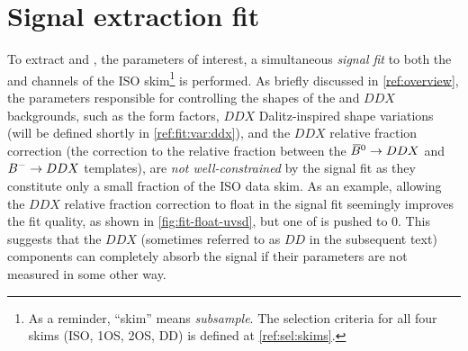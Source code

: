 \chapter{Signal extraction fit}
\label{ref:fit}

To extract \RD and \RDst, the parameters of interest,
a simultaneous \emph{signal fit}
to both the \Dz and \Dstar channels of the ISO skim\footnote{
    As a reminder, ``skim'' means \emph{subsample}.
    The selection criteria for all four skims (ISO, 1OS, 2OS, DD) is defined at
    \cref{ref:sel:skims}.
} is performed.
As briefly discussed in \cref{ref:overview},
the parameters responsible for controlling the shapes of the \Dstst and
$DDX$ backgrounds,
such as the \Dstst form factors,
$DDX$ Dalitz-inspired shape variations
(will be defined shortly in \cref{ref:fit:var:ddx}),
and the $DDX$ relative fraction correction
(the correction to the relative fraction between the
${{\kern 0.18em\overline{\kern -0.18em B}}{}^0} \rightarrow DDX$ and ${{{B}^-}} \rightarrow DDX$ templates),
are \emph{not well-constrained} by the signal fit as they constitute only a
small fraction of the ISO data skim.
As an example,
allowing the $DDX$ relative fraction correction to float in the signal fit
seemingly improves the fit quality,
as shown in \cref{fig:fit-float-uvsd},
but one of \RDX is pushed to 0.
This suggests that the $DDX$
(sometimes referred to as $DD$ in the subsequent text) components can completely
absorb the signal if their parameters are not measured in some other way.

